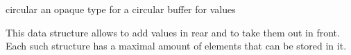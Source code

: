 \begin{DoxyDocu}{circular}
\label{circular_8h_a88c9f1a22851c06fd5d4138633e6d83e_a88c9f1a22851c06fd5d4138633e6d83e}
an opaque type for a circular buffer for  values

This data structure allows to add  values in rear and to take them out in front. Each such structure has a maximal amount of elements that can be stored in it.

\end{DoxyDocu}
